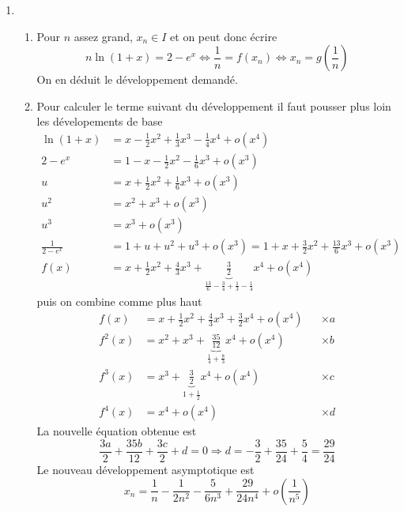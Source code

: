 \begin{enumerate}
  \item
\begin{enumerate}
  \item Pour $n$ assez grand, $x_n\in I$ et on peut donc écrire
\begin{displaymath}
n\ln(1+x) = 2 -e^x \Leftrightarrow \frac{1}{n} = f(x_n) \Leftrightarrow x_n = g(\frac{1}{n})  
\end{displaymath}
On en déduit le développement demandé.
  \item Pour calculer le terme suivant du développement il faut pousser plus loin les dévelopements de base
\begin{align*}
\ln(1+x) &= x -\frac{1}{2}x^2 + \frac{1}{3}x^3 -\frac{1}{4}x^4 + o(x^4)\\
2-e^x &= 1-x - \frac{1}{2}x^2 -\frac{1}{6}x^3+ o(x^3) \\
u &= x + \frac{1}{2}x^2 +\frac{1}{6}x^3+ o(x^3) \\
u^2 &= x^2 + x^3 +o(x^3) \\
u^3 &= x^3 + o(x^3) \\
\frac{1}{2-e^x} &= 1+u+u^2+u^3+o(x^3) =1 + x + \frac{3}{2}x^2 + \frac{13}{6}x^3 + o(x^3) \\
f(x) &= x + \frac{1}{2}x^2 + \frac{4}{3}x^3 + \underset{\frac{13}{6}-\frac{3}{4}+\frac{1}{3}-\frac{1}{4}}{\underbrace{\frac{3}{2}}} x^4 + o(x^4) 
\end{align*}
puis on combine comme plus haut
\begin{align*}
  f(x) &= x + \frac{1}{2}x^2 + \frac{4}{3}x^3 + \frac{3}{2}x^4 + o(x^4) & &\times a \\
  f^2(x) &= x^2 + x^3 + \underset{\frac{1}{4}+\frac{8}{3}}{\underbrace{\frac{35}{12}}}x^4 + o(x^4) & &\times b \\
  f^3(x) &= x^3 + \underset{1+\frac{1}{2}}{\underbrace{\frac{3}{2}}}x^4 + o(x^4) & &\times c \\
  f^4(x) &= x^4 + o(x^4) & &\times d
\end{align*}
La nouvelle équation obtenue est
\begin{displaymath}
  \frac{3a}{2} +\frac{35b}{12}+\frac{3c}{2} +d = 0
  \Rightarrow
  d = -\frac{3}{2} +\frac{35}{24} +\frac{5}{4} = \frac{29}{24}
\end{displaymath}
Le nouveau développement asymptotique est
\begin{displaymath}
  x_n = \frac{1}{n} - \frac{1}{2n^2} - \frac{5}{6n^3} + \frac{29}{24n^4} + o(\frac{1}{n^5})
\end{displaymath}
\end{enumerate}

\end{enumerate}
